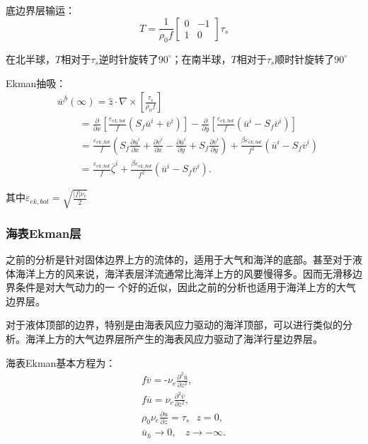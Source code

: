 \documentclass{article}
\begin{document}
底边界层输运：
$$T=\frac{1}{\rho_0f}\begin{bmatrix}
    0&-1\\
    1& 0
\end{bmatrix}\tau_s$$

在北半球，$T$相对于$\tau_s$逆时针旋转了$90^{\circ}$；在南半球，$T$相对于$\tau_s$顺时针旋转了$90^{\circ}$

Ekman抽吸：
\begin{align}
  & {{\overline{w}}^{b}}(\infty )=\widehat{z}\cdot \nabla \times \left[ \frac{{{\tau }_{s}}}{{{\rho }_{0}}f} \right] \\ 
 & \ \ \ \ \ \ \ \ \ \ =\frac{\partial }{\partial x}\left[\frac{{{\varepsilon }_{ek,bot}}}{f}({{S}_{f}}{{\overline{u}}^{i}}+{{\overline{v}}^{i}})\right]-\frac{\partial }{\partial y}\left[\frac{{{\varepsilon }_{ek,bot}}}{f}({{\overline{u}}^{i}}-{{S}_{f}}{{\overline{v}}^{i}})\right] \\ 
 & \ \ \ \ \ \ \ \ \ \ =\frac{{{\varepsilon }_{ek,bot}}}{f}({{S}_{f}}\frac{\partial {{\overline{u}}^{i}}}{\partial x}+\frac{\partial {{\overline{v}}^{i}}}{\partial x}-\frac{\partial {{\overline{u}}^{i}}}{\partial y}+{{S}_{f}}\frac{\partial {{\overline{v}}^{i}}}{\partial y})+\frac{\beta {{\varepsilon }_{ek,bot}}}{{{f}^{2}}}({{\overline{u}}^{i}}-{{S}_{f}}{{\overline{v}}^{i}}) \\ 
 & \ \ \ \ \ \ \ \ \ \ =\frac{{{\varepsilon }_{ek,bot}}}{f}{{\overline{\zeta }}^{i}}+\frac{\beta {{\varepsilon }_{ek,bot}}}{{{f}^{2}}}({{\overline{u}}^{i}}-{{S}_{f}}{{\overline{v}}^{i}}).\ \ \ \  
\end{align}

其中${\varepsilon }_{ek,bot}=\sqrt{\frac{|f|\nu_e}{2}}$

\subsubsection{海表Ekman层}
之前的分析是针对固体边界上方的流体的，适用于大气和海洋的底部。甚至对于液体海洋上方的风来说，海洋表层洋流通常比海洋上方的风要慢得多。因而无滑移边界条件是对大气动力的一 个好的近似，因此之前的分析也适用于海洋上方的大气边界层。

对于液体顶部的边界，特别是由海表风应力驱动的海洋顶部，可以进行类似的分析。海洋上方的大气边界层所产生的海表风应力驱动了海洋行星边界层。

海表Ekman基本方程为：
\begin{align}
  & f\overline{v}=\text{-}{{\nu }_{e}}\frac{{{\partial }^{2}}\overline{u}}{\partial {{z}^{2}}}, \\ 
 & f\overline{u}={{\nu }_{e}}\frac{{{\partial }^{2}}\overline{v}}{\partial {{z}^{2}}}, \\ 
 & \rho_0\nu_e\frac{\partial u}{\partial z} = \tau_s\ \ \ z=0, \\ 
 & {{\overline{u}}_{h}}\to 0,\ \ \ \ z\to -\infty .\ \ \ \  
\end{align}
\end{document}

